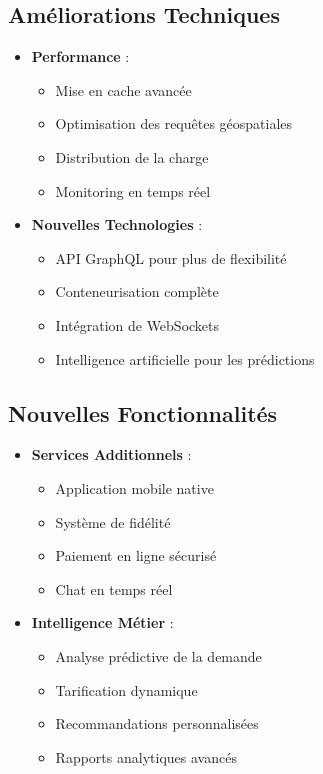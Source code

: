 \subsection{Améliorations Techniques}
\begin{itemize}
    \item \textbf{Performance} :
    \begin{itemize}
        \item Mise en cache avancée
        \item Optimisation des requêtes géospatiales
        \item Distribution de la charge
        \item Monitoring en temps réel
    \end{itemize}
    
    \item \textbf{Nouvelles Technologies} :
    \begin{itemize}
        \item API GraphQL pour plus de flexibilité
        \item Conteneurisation complète
        \item Intégration de WebSockets
        \item Intelligence artificielle pour les prédictions
    \end{itemize}
\end{itemize}

\subsection{Nouvelles Fonctionnalités}
\begin{itemize}
    \item \textbf{Services Additionnels} :
    \begin{itemize}
        \item Application mobile native
        \item Système de fidélité
        \item Paiement en ligne sécurisé
        \item Chat en temps réel
    \end{itemize}
    
    \item \textbf{Intelligence Métier} :
    \begin{itemize}
        \item Analyse prédictive de la demande
        \item Tarification dynamique
        \item Recommandations personnalisées
        \item Rapports analytiques avancés
    \end{itemize}
\end{itemize}

